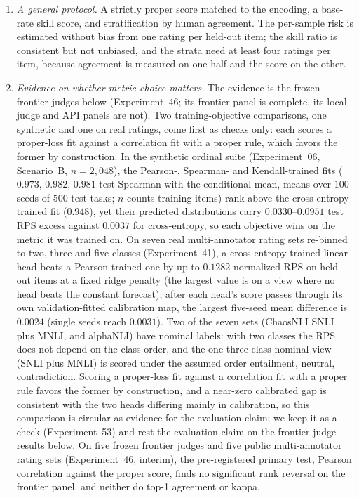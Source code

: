 \begin{enumerate}
\item \emph{A general protocol.} A strictly proper score matched to the encoding, a base-rate skill score, and stratification by human agreement. The per-sample risk is estimated without bias from one rating per held-out item; the skill ratio is consistent but not unbiased, and the strata need at least four ratings per item, because agreement is measured on one half and the score on the other.
\item \emph{Evidence on whether metric choice matters.} The evidence is the frozen frontier judges below (Experiment~46; its frontier panel is complete, its local-judge and API panels are not). Two training-objective comparisons, one synthetic and one on real ratings, come first as checks only: each scores a proper-loss fit against a correlation fit with a proper rule, which favors the former by construction.
In the synthetic ordinal suite (Experiment~06, Scenario~B, $n=2{,}048$), the Pearson-, Spearman- and Kendall-trained fits ($0.973$, $0.982$, $0.981$ test Spearman with the conditional mean, means over $100$ seeds of $500$ test tasks; $n$ counts training items) rank above the cross-entropy-trained fit ($0.948$), yet their predicted distributions carry $0.0330$--$0.0951$ test RPS excess against $0.0037$ for cross-entropy, so each objective wins on the metric it was trained on.
On seven real multi-annotator rating sets re-binned to two, three and five classes (Experiment~41), a cross-entropy-trained linear head beats a Pearson-trained one by up to $0.1282$ normalized RPS on held-out items at a fixed ridge penalty (the largest value is on a view where no head beats the constant forecast); after each head's score passes through its own validation-fitted calibration map, the largest five-seed mean difference is $0.0024$ (single seeds reach $0.0031$). Two of the seven sets (ChaosNLI SNLI plus MNLI, and alphaNLI) have nominal labels: with two classes the RPS does not depend on the class order, and the one three-class nominal view (SNLI plus MNLI) is scored under the assumed order entailment, neutral, contradiction.
Scoring a proper-loss fit against a correlation fit with a proper rule favors the former by construction, and a near-zero calibrated gap is consistent with the two heads differing mainly in calibration, so this comparison is circular as evidence for the evaluation claim; we keep it as a check (Experiment~53) and rest the evaluation claim on the frontier-judge results below.
On five frozen frontier judges and five public multi-annotator rating sets (Experiment~46, interim), the pre-registered primary test, Pearson correlation against the proper score, finds no significant rank reversal on the frontier panel, and neither do top-1 agreement or kappa.

\end{enumerate}
